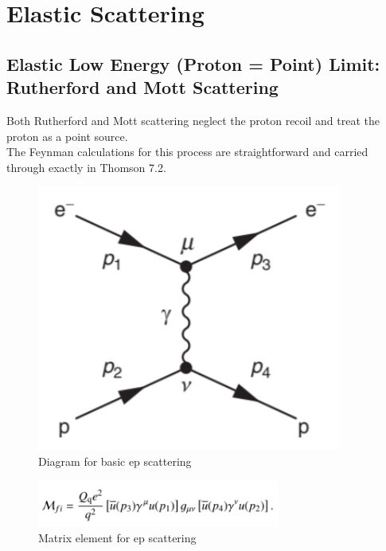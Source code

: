 \chapter{Elastic Scattering}

    \section{Elastic Low Energy (Proton = Point) Limit: Rutherford and Mott Scattering}
        \indent Both Rutherford and Mott scattering neglect the proton recoil and treat the proton as a point source. \\
        \indent The Feynman calculations for this process are straightforward and carried through exactly in Thomson 7.2. \\
        
        \begin{figure}[H]
            \centering
            \includegraphics[width=10cm]{NuclearPhysics/modules/lepton-scattering/pics/elastic-ep/rut-1.PNG}
            \caption{Diagram for basic ep scattering}
        \end{figure}
        
        \begin{figure}[H]
            \centering
            \includegraphics[width=8cm]{NuclearPhysics/modules/lepton-scattering/pics/elastic-ep/rut-matrix.PNG}
            \caption{Matrix element for ep scattering}
        \end{figure}
        

